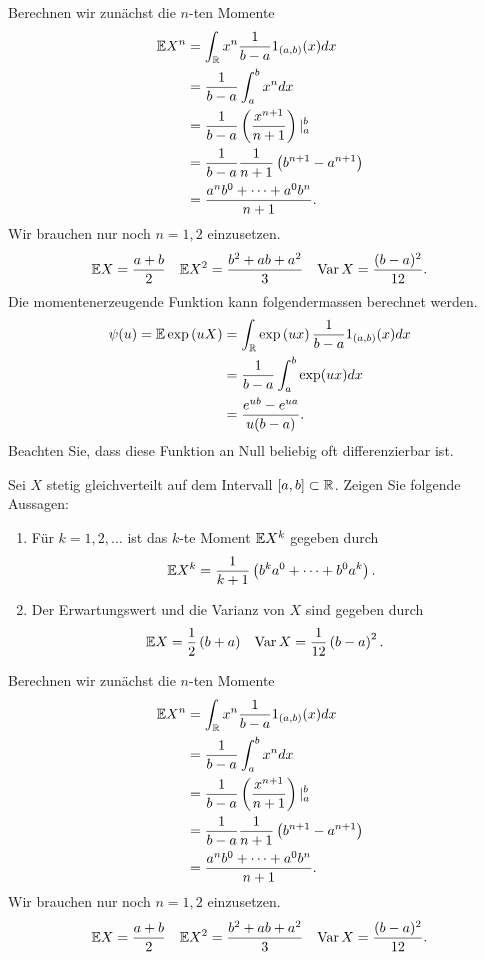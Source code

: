\solution Berechnen wir zunächst die $n$-ten Momente
\begin{align*}
    \mathbb{E} X^n &= \int_{\mathbb{R}}^{} x^n \frac{1}{b-a} 1_{(a,b)}(x) dx \\
    &= \frac{1}{b-a} \int_{a}^{b} x^n dx \\
    &= \frac{1}{b-a} \left( \frac{x^{n+1}}{n+1} \right) |_{a}^{b} \\
    &= \frac{1}{b-a}\frac{1}{n+1} \left( b^{n+1}-a^{n+1} \right) \\
    &= \frac{a^n b^{0} +\cdots+ a^0 b^{n}}{n+1}.
\end{align*}
Wir brauchen nur noch $n=1,2$ einzusetzen.
\begin{align*}
    \mathbb{E} X &= \frac{a+b}{2} & \mathbb{E} X^2 &= \frac{b^2 + ab + a^2}{3} & 
    \operatorname{Var} X = \frac{(b-a)^2}{12}.
\end{align*}
Die momentenerzeugende Funktion kann folgendermassen berechnet werden. 
\begin{align*}
    \psi(u) = \mathbb{E} \exp\left( uX \right) &= 
    \int_{\mathbb{R}} \exp \left( ux \right) \frac{1}{b-a} 1_{(a,b)}(x) dx \\
    &= \frac{1}{b-a} \int_{a}^{b} \exp (ux) dx \\
    &= \frac{e^{ub}-e^{ua}}{u(b-a)}.
\end{align*}
Beachten Sie, dass diese Funktion an Null beliebig oft differenzierbar ist. 


Sei $X$ stetig gleichverteilt auf dem Intervall $\left[ a,b \right]\subset \mathbb{R}$.
Zeigen Sie folgende Aussagen: 
\begin{enumerate}
    \item Für $k=1,2,\dots$ ist das $k$-te Moment $\mathbb E X^{k}$ gegeben durch
        \begin{equation*}
            \mathbb E X^k = \frac{1}{k+1}\left( b^{k}a^0 + \cdots + b^{0}a^{k} \right).
        \end{equation*}
    \item Der Erwartungswert und die Varianz von $X$ sind gegeben durch
        \begin{align*}
            \mathbb E X    & = \frac{1}{2} \left( b+a \right) & 
            \operatorname{Var} X  & = \frac{1}{12} \left( b-a \right)^{2}.  
        \end{align*}
\end{enumerate}

\solution Berechnen wir zunächst die $n$-ten Momente
\begin{align*}
    \mathbb E X^n &= \int_{\mathbb{R}}^{} x^n \frac{1}{b-a} 1_{(a,b)}(x) dx \\
    &= \frac{1}{b-a} \int_{a}^{b} x^n dx \\
    &= \frac{1}{b-a} \left( \frac{x^{n+1}}{n+1} \right) |_{a}^{b} \\
    &= \frac{1}{b-a}\frac{1}{n+1} \left( b^{n+1}-a^{n+1} \right) \\
    &= \frac{a^n b^{0} +\cdots+ a^0 b^{n}}{n+1}.
\end{align*}
Wir brauchen nur noch $n=1,2$ einzusetzen.
\begin{align*}
    \mathbb E X &= \frac{a+b}{2} & \mathbb E X^2 &= \frac{b^2 + ab + a^2}{3} & 
    \operatorname{Var} X = \frac{(b-a)^2}{12}.
\end{align*}


